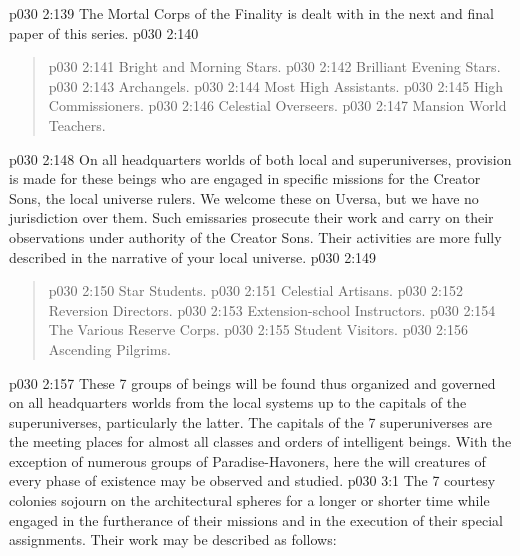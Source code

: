 \vs p030 2:139 \pc The Mortal Corps of the Finality is dealt with in the next and final paper of this series.
\vsetspace
\vs p030 2:140 \bibnobreakspace {}
\begin{quote}
\vs p030 2:141 \bibnobreakspace Bright and Morning Stars.
\vs p030 2:142 \bibnobreakspace Brilliant Evening Stars.
\vs p030 2:143 \bibnobreakspace Archangels.
\vs p030 2:144 \bibnobreakspace Most High Assistants.
\vs p030 2:145 \bibnobreakspace High Commissioners.
\vs p030 2:146 \bibnobreakspace Celestial Overseers.
\vs p030 2:147 \bibnobreakspace Mansion World Teachers.
\end{quote}
\vs p030 2:148 \pc On all headquarters worlds of both local and superuniverses, provision is made for these beings who are engaged in specific missions for the Creator Sons, the local universe rulers. We welcome these  on Uversa, but we have no jurisdiction over them. Such emissaries prosecute their work and carry on their observations under authority of the Creator Sons. Their activities are more fully described in the narrative of your local universe.
\vsetspace
\vs p030 2:149 \bibnobreakspace {}
\begin{quote}
\vs p030 2:150 \bibnobreakspace Star Students.
\vs p030 2:151 \bibnobreakspace Celestial Artisans.
\vs p030 2:152 \bibnobreakspace Reversion Directors.
\vs p030 2:153 \bibnobreakspace Extension\hyp{}school Instructors.
\vs p030 2:154 \bibnobreakspace The Various Reserve Corps.
\vs p030 2:155 \bibnobreakspace Student Visitors.
\vs p030 2:156 \bibnobreakspace Ascending Pilgrims.
\end{quote}
\vs p030 2:157 \pc These 7 groups of beings will be found thus organized and governed on all headquarters worlds from the local systems up to the capitals of the superuniverses, particularly the latter. The capitals of the 7 superuniverses are the meeting places for almost all classes and orders of intelligent beings. With the exception of numerous groups of Paradise\hyp{}Havoners, here the will creatures of every phase of existence may be observed and studied.
\vs p030 3:1 The 7 courtesy colonies sojourn on the architectural spheres for a longer or shorter time while engaged in the furtherance of their missions and in the execution of their special assignments. Their work may be described as follows:
